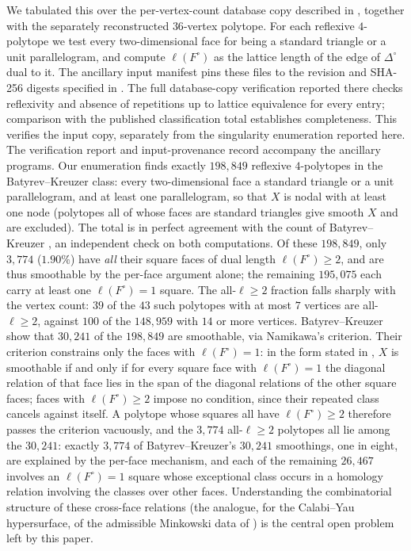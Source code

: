 \documentclass[11pt]{amsart}
\theoremstyle{definition}
\theoremstyle{remark}
\begin{document}
We tabulated this over the per-vertex-count database copy described in
\cite[\S6.1]{paper1}, together with the separately reconstructed
$36$-vertex polytope.  For each reflexive $4$-polytope we test every two-dimensional face for being
a standard triangle or a unit parallelogram, and compute $\ell(F^\circ)$
as the lattice length of the edge of $\Delta^\circ$ dual to it.  The
ancillary input manifest pins these files to the revision and SHA-256
digests specified in \cite[\S6.1]{paper1}.  The full database-copy
verification reported there checks reflexivity and absence of repetitions
up to lattice equivalence for every entry; comparison with the published
classification total establishes completeness.  This verifies the input
copy, separately from the singularity enumeration reported here.
The verification report and input-provenance record accompany the
ancillary programs.  Our enumeration
finds exactly $198{,}849$ reflexive $4$-polytopes in the
Batyrev--Kreuzer class: every two-dimensional face a standard triangle
or a unit
parallelogram, and at least one parallelogram, so that $X$ is nodal with
at least one node (polytopes all of whose faces are standard triangles
give smooth $X$ and are excluded).  The total is
in perfect agreement with the count of Batyrev--Kreuzer \cite{BK10}, an
independent check on both computations.  Of these $198{,}849$, only
$3{,}774$ ($1.90\%$) have \emph{all} their square faces of dual length
$\ell(F^\circ)\ge 2$, and are thus smoothable by the per-face argument
alone; the remaining $195{,}075$ each carry at least one
$\ell(F^\circ)=1$ square.  The all-$\ell\ge2$ fraction falls sharply with
the vertex count: $39$ of the $43$ such polytopes with at most $7$
vertices are all-$\ell\ge2$, against $100$ of the $148{,}959$ with $14$
or more vertices.  Batyrev--Kreuzer show that $30{,}241$ of the $198{,}849$
are smoothable, via Namikawa's criterion.  Their criterion constrains only
the faces with $\ell(F^\circ) = 1$: in the form stated in \cite{BK10},
$X$ is smoothable if and only if for every square face with
$\ell(F^\circ) = 1$ the diagonal relation of that face lies in the span
of the diagonal relations of the other square faces; faces with
$\ell(F^\circ) \ge 2$ impose no condition, since their repeated class
cancels against itself.  A polytope whose squares all have
$\ell(F^\circ) \ge 2$ therefore passes the criterion vacuously, and the
$3{,}774$ all-$\ell\ge2$ polytopes all lie among the $30{,}241$: exactly
$3{,}774$ of Batyrev--Kreuzer's $30{,}241$ smoothings, one in eight, are
explained by the per-face mechanism, and each of the remaining
$26{,}467$ involves an $\ell(F^\circ)=1$ square whose exceptional class
occurs in a homology relation involving the classes over other
faces.  Understanding the
combinatorial structure of these cross-face relations (the analogue,
for the Calabi--Yau hypersurface, of the admissible Minkowski data of
\cite{CHP24}) is the central open problem left by this paper.
\end{document}
